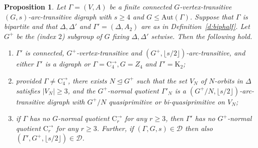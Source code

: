 \documentclass[11pt]{amsart}
\newtheorem{proposition}[theorem]{Proposition}
\newcommand{\Aut}{\mathrm{Aut}}
\newcommand{\C}{{\mathrm{C}}}
\newcommand\DD{{\mathscr{D}}}
\newcommand{\K}{\mathrm{K}}
\begin{document}
\begin{proposition}\label{p:bip}
   Let \(\Gamma=(V,A)\) be a finite connected $G$-vertex-transitive  \((G,s)\)-arc-transitive digraph with \(s\geqslant4\) and $G\leq\Aut(\Gamma)$. Suppose that $\Gamma$ is bipartite and that $\Delta, \Delta'$ and $\Gamma'=(\Delta, A_2)$ are as in Definition~\ref{d:biphalf}. Let $G^+$ be the (index $2$) subgroup of $G$ fixing $\Delta, \Delta'$ setwise. Then the following hold.
   \begin{enumerate}
     \item[(a)]    $\Gamma'$ is connected, $G^+$-vertex-transitive and  \((G^+,\lfloor s/2\rfloor)\)-arc-transitive, and either $\Gamma'$ is a digraph or $\Gamma=\C_4^\to, G=Z_4$ and $\Gamma'=\K_2$;
     \item[(b)] provided $\Gamma\ne \C_4^\to$, there exists $N\unlhd G^+$ such that the set $V_N$ of $N$-orbits in $\Delta$ satisfies $|V_N|\geqslant3$, and the $G^+$-normal quotient $\Gamma'_N$ is a $(G^+/N,\lfloor s/2\rfloor)$-arc-transitive digraph with $G^+/N$ quasiprimitive or bi-quasiprimitive on $V_N$;
     \item[(c)]  if $\Gamma$ has no $G$-normal quotient $\C_r^\to$ for any $r\geq3$, then $\Gamma'$ has no $G^+$-normal quotient $\C_r^\to$ for any $r\geq3$. Further, if    $(\Gamma, G, s)\in\DD$ then also $(\Gamma', G^+, \lfloor s/2\rfloor)\in\DD$.
   \end{enumerate}
\end{proposition}
\end{document}
